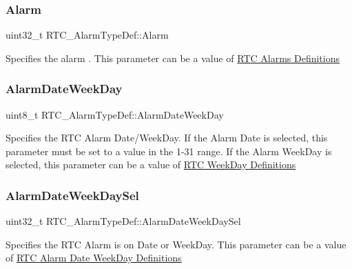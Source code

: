 \subsubsection{\texorpdfstring{Alarm}{Alarm}}
{\footnotesize\ttfamily uint32\+\_\+t R\+T\+C\+\_\+\+Alarm\+Type\+Def\+::\+Alarm}

Specifies the alarm . This parameter can be a value of \hyperlink{group___r_t_c___alarms___definitions}{R\+TC Alarms Definitions} \mbox{\label{struct_r_t_c___alarm_type_def_a0c437cb24f8b12e753e522bf0c48a4d7}} 
\subsubsection{\texorpdfstring{Alarm\+Date\+Week\+Day}{AlarmDateWeekDay}}
{\footnotesize\ttfamily uint8\+\_\+t R\+T\+C\+\_\+\+Alarm\+Type\+Def\+::\+Alarm\+Date\+Week\+Day}

Specifies the R\+TC Alarm Date/\+Week\+Day. If the Alarm Date is selected, this parameter must be set to a value in the 1-\/31 range. If the Alarm Week\+Day is selected, this parameter can be a value of \hyperlink{group___r_t_c___week_day___definitions}{R\+TC Week\+Day Definitions} \mbox{\label{struct_r_t_c___alarm_type_def_a366ce4c7ad04d5a29550d30d93361324}} 
\subsubsection{\texorpdfstring{Alarm\+Date\+Week\+Day\+Sel}{AlarmDateWeekDaySel}}
{\footnotesize\ttfamily uint32\+\_\+t R\+T\+C\+\_\+\+Alarm\+Type\+Def\+::\+Alarm\+Date\+Week\+Day\+Sel}

Specifies the R\+TC Alarm is on Date or Week\+Day. This parameter can be a value of \hyperlink{group___r_t_c___alarm_date_week_day___definitions}{R\+TC Alarm Date Week\+Day Definitions} \mbox{\label{struct_r_t_c___alarm_type_def_a6d5665858df4c99e589beebe7f2d120b}} 
